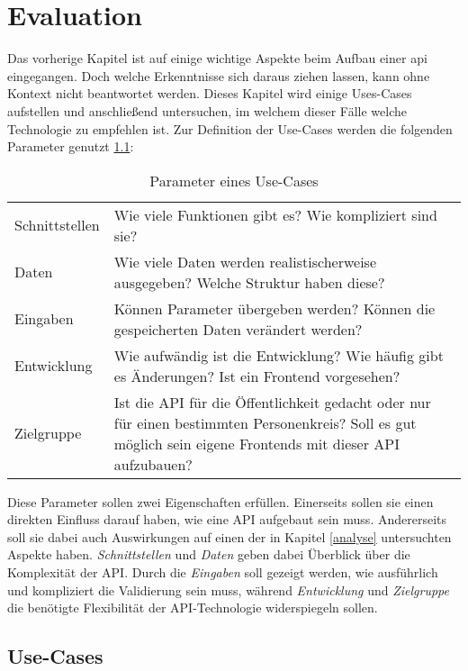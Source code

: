 \chapter{Evaluation}\label{evaluation}

Das vorherige Kapitel ist auf einige wichtige Aspekte beim Aufbau einer \ac{api} eingegangen. Doch welche Erkenntnisse sich daraus ziehen lassen, kann ohne Kontext nicht beantwortet werden. Dieses Kapitel wird einige Uses-Cases aufstellen und anschließend untersuchen, im welchem dieser Fälle welche Technologie zu empfehlen ist. Zur Definition der Use-Cases werden die folgenden Parameter genutzt \ref{tab:Parameter}:

\begin{table}[H]
\begin{tabular}{p{3cm} p{11cm}}
Schnittstellen & Wie viele Funktionen gibt es? Wie kompliziert sind sie?\\
Daten &  Wie viele Daten werden realistischerweise ausgegeben? Welche Struktur haben diese? \\
Eingaben & Können Parameter übergeben werden? Können die gespeicherten Daten verändert werden? \\
Entwicklung & Wie aufwändig ist die Entwicklung? Wie häufig gibt es Änderungen? Ist ein Frontend vorgesehen? \\
Zielgruppe & Ist die API für die Öffentlichkeit gedacht oder nur für einen bestimmten Personenkreis? Soll es gut möglich sein eigene Frontends mit dieser API aufzubauen? \\
\end{tabular}
\caption{Parameter eines Use-Cases}
\label{tab:Parameter}
\end{table}

Diese Parameter sollen zwei Eigenschaften erfüllen. Einerseits sollen sie einen direkten Einfluss darauf haben, wie eine API aufgebaut sein muss. Andererseits soll sie dabei auch Auswirkungen auf einen der in Kapitel \ref{analyse} untersuchten Aspekte haben. \textit{Schnittstellen} und \textit{Daten} geben dabei Überblick über die Komplexität der API. Durch die \textit{Eingaben} soll gezeigt werden, wie ausführlich und kompliziert die Validierung sein muss, während \textit{Entwicklung} und \textit{Zielgruppe} die benötigte Flexibilität der API-Technologie widerspiegeln sollen. 

\section{Use-Cases}

